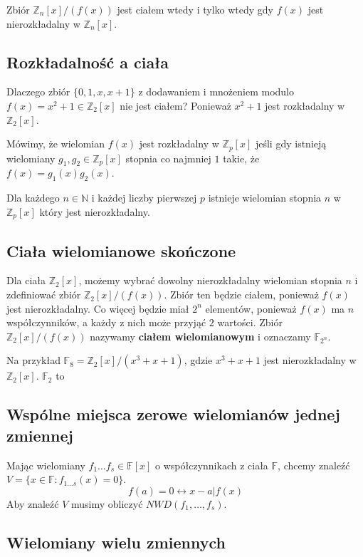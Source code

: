 \documentclass{../notatki}
\begin{document}
Zbiór $\mathbb{Z}_n[x] / (f(x))$ jest ciałem wtedy i tylko wtedy gdy $f(x)$
jest nierozkładalny w $\mathbb{Z}_n[x]$.

\subsection{Rozkładalność a ciała}

Dlaczego zbiór $\{0, 1, x, x + 1\}$ z dodawaniem i mnożeniem modulo
$f(x) = x^2 + 1 \in \mathbb{Z}_2[x]$ nie jest ciałem? Ponieważ $x^2 +
1$ jest rozkładalny w $\mathbb{Z}_2[x]$.

Mówimy, że wielomian $f(x)$ jest rozkładalny w $\mathbb{Z}_p[x]$
jeśli gdy istnieją
wielomiany $g_1, g_2 \in \mathbb{Z}_p[x]$ stopnia co najmniej $1$ takie, że
$f(x) = g_1(x)g_2(x)$.

Dla każdego $n \in \mathbb{N}$ i każdej liczby pierwszej $p$ istnieje wielomian
stopnia $n$ w $\mathbb{Z}_p[x]$ który jest nierozkładalny.

\subsection{Ciała wielomianowe skończone}

Dla ciała $\mathbb{Z}_2[x]$, możemy wybrać dowolny nierozkładalny wielomian
stopnia $n$ i zdefiniować zbiór $\mathbb{Z}_2[x] / (f(x))$. Zbiór ten
będzie ciałem, ponieważ $f(x)$ jest nierozkładalny. Co więcej będzie miał
$2^n$ elementów, ponieważ $f(x)$ ma $n$ współczynników, a każdy z nich
może przyjąć $2$ wartości. Zbiór $\mathbb{Z}_2[x] / (f(x))$ nazywamy
\textbf{ciałem wielomianowym} i oznaczamy $\mathbb{F}_{2^n}$.

Na przykład $\mathbb{F}_8 = \mathbb{Z}_2[x]/(x^3 + x + 1)$, gdzie
$x^3 + x + 1$ jest nierozkładalny w $\mathbb{Z}_2[x]$. $\mathbb{F}_2$ to

\subsection{Wspólne miejsca zerowe wielomianów jednej zmiennej}

Mając wielomiany $f_1 \dots f_s \in \mathbb{F}[x]$ o współczynnikach
z ciała $\mathbb{F}$, chcemy znaleźć $V = \{x \in \mathbb{F}: f_{1
\dots s}(x) = 0 \}$.
$$
f(a) = 0 \leftrightarrow x - a | f(x)
$$
Aby znaleźć $V$ musimy obliczyć $NWD(f_1, \dots, f_s)$.

\subsection{Wielomiany wielu zmiennych}
\end{document}
